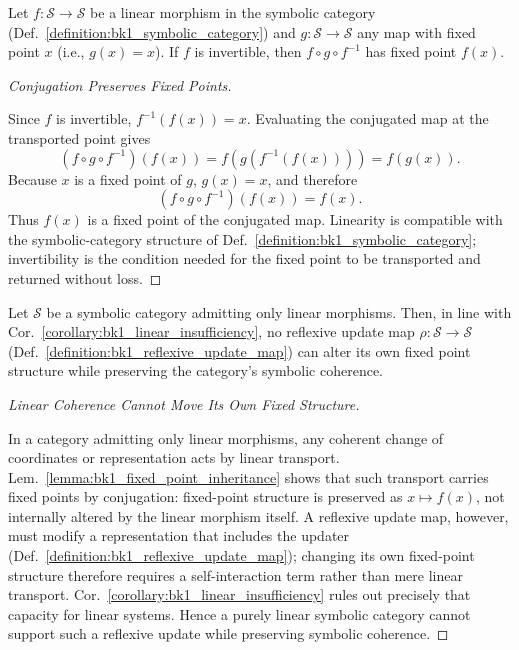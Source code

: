 \begin{lemma}
\label{lemma:bk1_fixed_point_inheritance}
Let $f: \mathcal{S} \to \mathcal{S}$ be a linear morphism in the symbolic category (Def.~\ref{definition:bk1_symbolic_category}) and $g: \mathcal{S} \to \mathcal{S}$ any map with fixed point $x$ (i.e., $g(x) = x$). If $f$ is invertible, then $f \circ g \circ f^{-1}$ has fixed point $f(x)$.
\end{lemma}
\begin{proof}[Conjugation Preserves Fixed Points]
\label{proof:bk1_fixed_point_inheritance}
\leavevmode

Since \(f\) is invertible, \(f^{-1}(f(x))=x\). Evaluating the conjugated map at
the transported point gives
\[
(f\circ g\circ f^{-1})(f(x))=f(g(f^{-1}(f(x))))=f(g(x)).
\]
Because \(x\) is a fixed point of \(g\), \(g(x)=x\), and therefore
\[
(f\circ g\circ f^{-1})(f(x))=f(x).
\]
Thus \(f(x)\) is a fixed point of the conjugated map. Linearity is compatible
with the symbolic-category structure of Def.~\ref{definition:bk1_symbolic_category};
invertibility is the condition needed for the fixed point to be transported and
returned without loss.
\end{proof}

\begin{proposition}
\label{proposition:bk1_limitation_linear_reflexive_maps}
Let $\mathcal{S}$ be a symbolic category admitting only linear morphisms. Then, in line with Cor.~\ref{corollary:bk1_linear_insufficiency}, no reflexive update map $\rho: \mathcal{S} \to \mathcal{S}$ (Def.~\ref{definition:bk1_reflexive_update_map}) can alter its own fixed point structure while preserving the category's symbolic coherence.
\end{proposition}
\begin{proof}[Linear Coherence Cannot Move Its Own Fixed Structure]
\label{proof:bk1_limitation_linear_reflexive_maps}
\leavevmode

In a category admitting only linear morphisms, any coherent change of coordinates
or representation acts by linear transport. Lem.~\ref{lemma:bk1_fixed_point_inheritance}
shows that such transport carries fixed points by conjugation: fixed-point
structure is preserved as \(x\mapsto f(x)\), not internally altered by the
linear morphism itself. A reflexive update map, however, must modify a
representation that includes the updater (Def.~\ref{definition:bk1_reflexive_update_map});
changing its own fixed-point structure therefore requires a self-interaction
term rather than mere linear transport. Cor.~\ref{corollary:bk1_linear_insufficiency}
rules out precisely that capacity for linear systems. Hence a purely linear
symbolic category cannot support such a reflexive update while preserving
symbolic coherence.
\end{proof}

